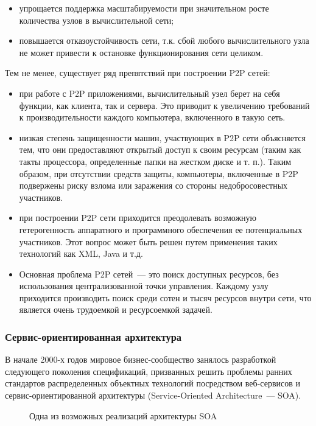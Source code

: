 \begin{itemize}
\item упрощается поддержка масштабируемости при значительном росте количества узлов в вычислительной сети; 
\item повышается отказоустойчивость сети, т.к. сбой любого вычислительного узла не может привести к остановке функционирования сети целиком.
\end{itemize}

Тем не менее, существует ряд препятствий при построении P2P сетей:
\begin{itemize}
\item при работе с P2P приложениями, вычислительный узел берет на себя функции, как клиента, так и сервера. Это приводит к увеличению требований к производительности каждого компьютера, включенного в такую сеть.
\item низкая степень защищенности машин, участвующих в P2P сети объясняется тем, что они предоставляют открытый доступ к своим ресурсам (таким как такты процессора, определенные папки на жестком диске и т. п.). Таким образом, при отсутствии средств защиты, компьютеры, включенные в P2P подвержены риску взлома или заражения со стороны недобросовестных участников. 
\item при построении P2P сети приходится преодолевать возможную гетерогенность аппаратного и программного обеспечения ее потенциальных участников. Этот вопрос может быть решен путем применения таких технологий как XML, Java и т.д.
\item Основная проблема P2P сетей~--- это поиск доступных ресурсов, без использования централизованной точки управления. Каждому узлу приходится производить поиск среди сотен и тысяч ресурсов внутри сети, что является очень трудоемкой и ресурсоемкой задачей.
\end{itemize}

\subsubsection{Сервис-ориентированная архитектура}
В начале 2000-х годов мировое бизнес-сообщество занялось разработкой следующего поколения спецификаций, призванных решить проблемы ранних стандартов распределенных объектных технологий посредством веб-сервисов и сервис-ориентированной архитектуры (Service-Oriented Architecture~--- SOA).

\begin{figure}[h]
\caption{Одна из возможных реализаций архитектуры SOA}
\label{0:soa}
\end{figure}

